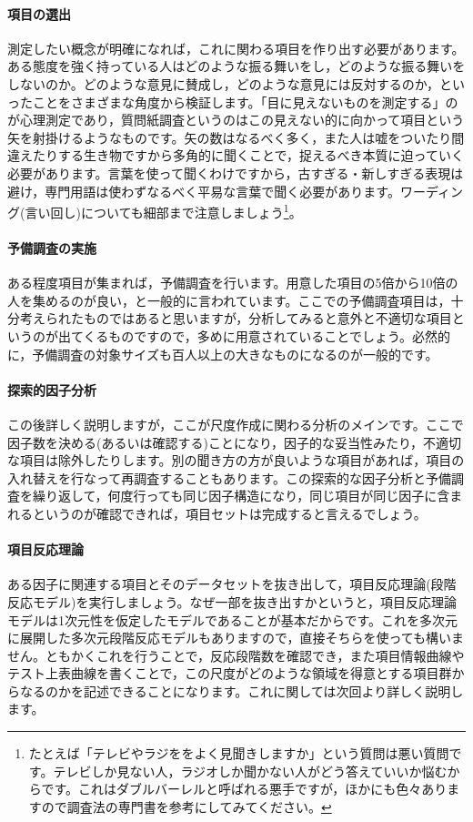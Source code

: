\documentclass{ltjsbook}
\begin{document}
\paragraph{項目の選出}測定したい概念が明確になれば，これに関わる項目を作り出す必要があります。ある態度を強く持っている人はどのような振る舞いをし，どのような振る舞いをしないのか。どのような意見に賛成し，どのような意見には反対するのか，といったことをさまざまな角度から検証します。「目に見えないものを測定する」のが心理測定であり，質問紙調査というのはこの見えない的に向かって項目という矢を射掛けるようなものです。矢の数はなるべく多く，また人は嘘をついたり間違えたりする生き物ですから多角的に聞くことで，捉えるべき本質に迫っていく必要があります。言葉を使って聞くわけですから，古すぎる・新しすぎる表現は避け，専門用語は使わずなるべく平易な言葉で聞く必要があります。ワーディング(言い回し)についても細部まで注意しましょう\footnote{たとえば「テレビやラジををよく見聞きしますか」という質問は悪い質問です。テレビしか見ない人，ラジオしか聞かない人がどう答えていいか悩むからです。これはダブルバーレルと呼ばれる悪手ですが，ほかにも色々ありますので調査法の専門書を参考にしてみてください。}。

\paragraph{予備調査の実施}ある程度項目が集まれば，予備調査を行います。用意した項目の5倍から10倍の人を集めるのが良い，と一般的に言われています\citet{kosugi2016a}。ここでの予備調査項目は，十分考えられたものではあると思いますが，分析してみると意外と不適切な項目というのが出てくるものですので，多めに用意されていることでしょう。必然的に，予備調査の対象サイズも百人以上の大きなものになるのが一般的です。

\paragraph{探索的因子分析}この後詳しく説明しますが，ここが尺度作成に関わる分析のメインです。ここで因子数を決める(あるいは確認する)ことになり，因子的な妥当性みたり，不適切な項目は除外したりします。別の聞き方の方が良いような項目があれば，項目の入れ替えを行なって再調査することもあります。この探索的な因子分析と予備調査を繰り返して，何度行っても同じ因子構造になり，同じ項目が同じ因子に含まれるというのが確認できれば，項目セットは完成すると言えるでしょう。

\paragraph{項目反応理論}ある因子に関連する項目とそのデータセットを抜き出して，項目反応理論(段階反応モデル)を実行しましょう。なぜ一部を抜き出すかというと，項目反応理論モデルは1次元性を仮定したモデルであることが基本だからです。これを多次元に展開した多次元段階反応モデルもありますので，直接そちらを使っても構いません。ともかくこれを行うことで，反応段階数を確認でき，また項目情報曲線やテスト上表曲線を書くことで，この尺度がどのような領域を得意とする項目群からなるのかを記述できることになります。これに関しては次回より詳しく説明します。
\end{document}

